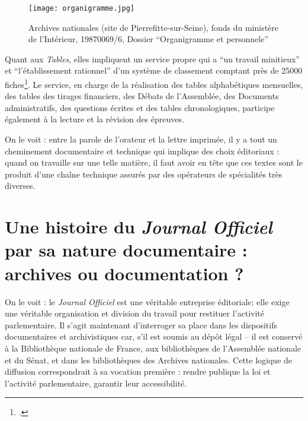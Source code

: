 \begin{figure}[htbp]
\centering
\texttt{[image: organigramme.jpg]}
\caption{Archives nationales (site de Pierrefitte-sur-Seine), fonds du ministère de l'Intérieur, 19870069/6, Dossier \enquote{Organigramme et personnele} }
\label{fig:organigramme}
\end{figure}

Quant aux \emph{Tables}, elles impliquent un service propre qui a \enquote{un travail minitieux} et \enquote{l'établissement rationnel} d'un système de classement comptant près de 25000 fiches\footcite[][]{cote6}. Le service, en charge de la réalisation des tables alphabétiques mensuelles, des tables des tirages financiers, des Débats de l'Assemblée, des Documents administratifs, des questions écrites et des tables chronologiques, participe également à la lecture et la révision des épreuves. 

On le voit : entre la parole de l'orateur et la lettre imprimée, il y a tout un cheminement documentaire et technique qui implique des choix éditoriaux : quand on travaille sur une telle matière, il faut avoir en tête que ces textes sont le produit d'une chaîne technique assurés par des opérateurs de spécialités très diverses.

\section{Une histoire du \emph{Journal Officiel} par sa nature documentaire : archives ou documentation ?}

On le voit : le \emph{Journal Officiel} est une véritable entreprise éditoriale; elle exige une véritable organisation et division du travail pour restituer l'activité parlementaire. Il s’agit maintenant d’interroger sa place dans les dispositifs documentaires et archivistiques car, s'il est soumis au dépôt légal -- il est conservé à la Bibliothèque nationale de France, aux bibliothèques de l’Assemblée nationale et du Sénat, et dans les bibliothèques des Archives nationales. Cette logique de diffusion correspondrait à sa vocation première : rendre publique la loi et l’activité parlementaire, garantir leur accessibilité.

